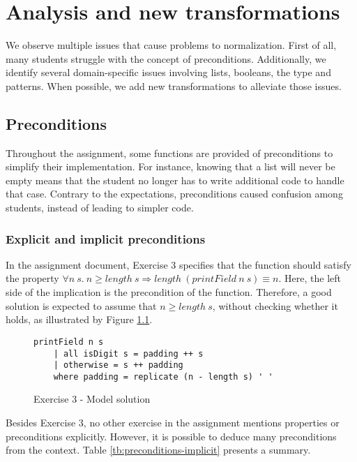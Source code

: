 \chapter{Analysis and new transformations}
\label{sec:analysis-results}

We observe multiple issues that cause problems to normalization. First of all, many students struggle with the concept of preconditions. Additionally, we identify several domain-specific issues involving lists, booleans, the  type and patterns. When possible, we add new transformations to alleviate those issues.

\section{Preconditions}
\label{sec:analysis-preconditions}

Throughout the assignment, some functions are provided of preconditions to simplify their implementation. For instance, knowing that a list will never be empty means that the student no longer has to write additional code to handle that case. Contrary to the expectations, preconditions caused confusion among students, instead of leading to simpler code.

\subsection{Explicit and implicit preconditions}

In the assignment document, Exercise 3 specifies that the function  should satisfy the property $\forall n\ s.\ n \geq length\ s \Rightarrow length\ (printField\ n\ s) \equiv n$. Here, the left side of the implication is the precondition of the function. Therefore, a good solution is expected to assume that $n \geq length\ s$, without checking whether it holds, as illustrated by Figure \ref{fig:ex3-model-solution}.

\begin{figure}[H]
\centering
\begin{verbatim}
printField n s
    | all isDigit s = padding ++ s
    | otherwise = s ++ padding
    where padding = replicate (n - length s) ' '
\end{verbatim}
\caption{Exercise 3 - Model solution}
\label{fig:ex3-model-solution}
\end{figure}

Besides Exercise 3, no other exercise in the assignment mentions properties or preconditions explicitly. However, it is possible to deduce many preconditions from the context. Table \ref{tb:preconditions-implicit} presents a summary.

